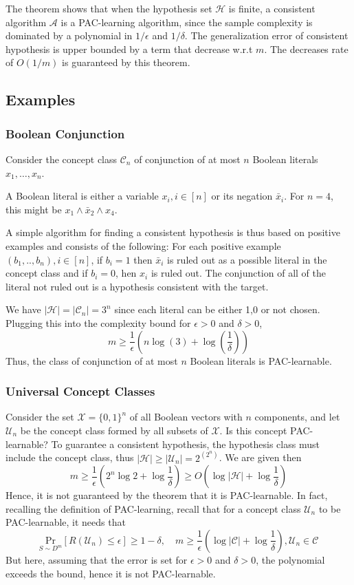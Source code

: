 The theorem shows that when the hypothesis set $\mathcal{H}$ is finite, a consistent algorithm $\mathcal{A}$ is a PAC-learning algorithm, since the sample complexity is dominated by a polynomial in $1/\epsilon$ and $1/\delta$. The generalization error of consistent hypothesis is upper bounded by a term that decrease w.r.t $m$. The decreases rate of $O(1/m)$ is guaranteed by this theorem. 

\subsection{Examples}
\subsubsection{Boolean Conjunction}
Consider the concept class $\mathcal{C}_{n}$ of conjunction of at most $n$ Boolean literals $x_{1},\dots,x_{n}$. 

A Boolean literal is either a variable $x_{i}, i\in [n]$ or its negation $\bar{x}_{i}$. For $n=4$, this might be $x_{1}\land  \bar{x}_{2}\land x_{4}$. 

A simple algorithm for finding a consistent hypothesis is thus based on positive examples and consists of the following: For each positive example $(b_{1},..,b_{n}),i\in [n]$, if $b_{i}=1$ then $\bar{x}_{i}$ is ruled out as a possible literal in the concept class and if $b_{i}=0$, hen $x_{i}$ is ruled out. The conjunction of all of the literal not ruled out is a hypothesis consistent with the target. 

We have $\lvert \mathcal{H} \rvert=\lvert \mathcal{C}_{n} \rvert=3^{n}$ since each literal can be either 1,0 or not chosen. Plugging this into the complexity bound for $\epsilon>0$ and $\delta>0$, $$m\geq \frac{1}{\epsilon}\left( n\log{(3)+\log{\left( \frac{1}{\delta} \right)}} \right)$$
Thus, the class of conjunction of at most $n$ Boolean literals is PAC-learnable. 
\subsubsection{Universal Concept Classes}
Consider the set $\mathcal{X}=\{ 0,1 \}^{n}$ of all Boolean vectors with $n$ components, and let $\mathcal{U}_{n}$ be the concept class formed by all subsets of $\mathcal{X}$. Is this concept PAC-learnable? To guarantee a consistent hypothesis, the hypothesis class must include the concept class, thus $\lvert \mathcal{H} \rvert\geq \lvert \mathcal{U}_{n} \rvert=2^{(2^{n})}$. We are given then $$m\geq \frac{1}{\epsilon}\left( 2^{n}\log{2}+\log{\frac{1}{\delta}} \right)\geq O\left( \log{\lvert \mathcal{H} \rvert +\log{\frac{1}{\delta}}} \right)$$
Hence, it is not guaranteed by the theorem that it is PAC-learnable. In fact, recalling the definition of PAC-learning, recall that for a concept class $\mathcal{U}_{n}$ to be PAC-learnable, it needs that $$\underset{S\sim D^{m}}{\mathrm{Pr}}[R(\mathcal{U}_{n})\leq \epsilon]\geq 1-\delta,\quad m \geq \frac{1}{\epsilon} \left( \log{\lvert \mathcal{C} \rvert }+\log{\frac{1}{\delta}} \right),\mathcal{U}_{n}\in\mathcal{C}$$
But here, assuming that the error is set for $\epsilon>0$ and $\delta>0$, the polynomial exceeds the bound, hence it is not PAC-learnable. 

